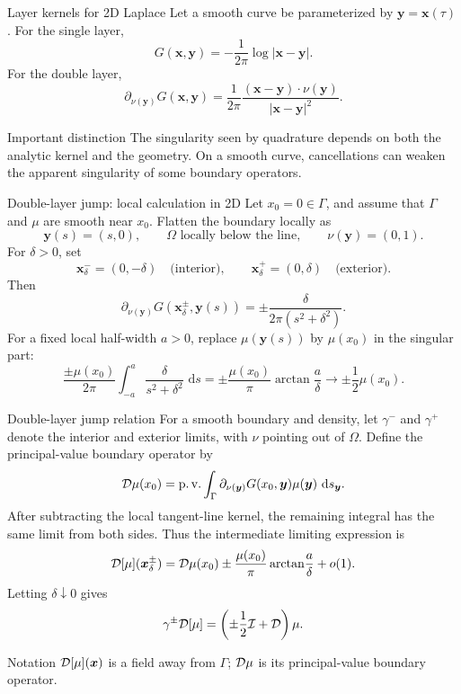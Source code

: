 \documentclass[aspectratio=169,11pt]{beamer}
\newcommand{\dd}{\,\mathrm d}
\newcommand{\x}{\bm{x}}
\newcommand{\y}{\bm{y}}
\begin{document}
\begin{frame}{Layer kernels for 2D Laplace}
\small
Let a smooth curve be parameterized by $\y=\x(\tau)$.
For the single layer,
\[
G(\x,\y)=-\frac{1}{2\pi}\log|\x-\y|.
\]
For the double layer,
\[
\partial_{\nu(\y)}G(\x,\y)
=\frac{1}{2\pi}
\frac{(\x-\y)\cdot\nu(\y)}{|\x-\y|^2}.
\]

\begin{block}{Important distinction}
The singularity seen by quadrature depends on both the analytic kernel and
the geometry. On a smooth curve, cancellations can weaken the apparent
singularity of some boundary operators.
\end{block}
\end{frame}

\begin{frame}{Double-layer jump: local calculation in 2D}
\small
Let $x_0=0\in\Gamma$, and assume that $\Gamma$ and $\mu$ are smooth near
$x_0$.  Flatten the boundary locally as
\[
  \y(s)=(s,0),\qquad \Omega\text{ locally below the line},\qquad
  \nu(\y)=(0,1).
\]
For $\delta>0$, set
\[
  \x_\delta^-=(0,-\delta)\quad\text{(interior)},
  \qquad
  \x_\delta^+=(0,\delta)\quad\text{(exterior)}.
\]
Then
\[
  \partial_{\nu(\y)}G(\x_\delta^\pm,\y(s))
  =\pm\frac{\delta}{2\pi(s^2+\delta^2)}.
\]
For a fixed local half-width $a>0$, replace $\mu(\y(s))$ by $\mu(x_0)$ in
the singular part:
\[
  \frac{\pm\mu(x_0)}{2\pi}
  \int_{-a}^{a}\frac{\delta}{s^2+\delta^2}\,\dd s
  =\pm\frac{\mu(x_0)}{\pi}\arctan\!\frac{a}{\delta}
  \longrightarrow \pm\frac12\mu(x_0).
\]
\end{frame}

\begin{frame}{Double-layer jump relation}
\small
For a smooth boundary and density, let $\gamma^-$ and $\gamma^+$ denote the
interior and exterior limits, with $\nu$ pointing out of $\Omega$.  Define the
principal-value boundary operator
by
\[
  \Dop\mu(x_0)=\operatorname{p.v.}\int_\Gamma
  \partial_{\nu(\y)}G(x_0,\y)\mu(\y)\,\dd s_{\y}.
\]
After subtracting the local tangent-line kernel, the remaining integral has
the same limit from both sides.  Thus the intermediate limiting expression is
\[
  \Dop[\mu](\x_\delta^\pm)
  =\Dop\mu(x_0)
  \pm\frac{\mu(x_0)}{\pi}\arctan\!\frac{a}{\delta}+o(1).
\]
Letting $\delta\downarrow0$ gives
\[
  \gamma^\pm\mathcal{D}[\mu]
  =\left(\pm\frac12\mathcal{I}+\mathcal{D}\right)\mu.
\]

\begin{block}{Notation}
$\Dop[\mu](\x)$ is a field away from $\Gamma$; $\mathcal{D}\mu$ is its
principal-value boundary operator.
\end{block}
\end{frame}
\end{document}
